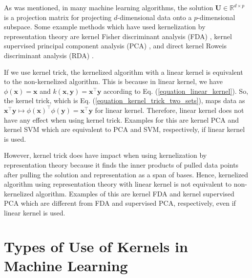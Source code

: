 \documentclass[lang=cn,10pt]{gorgeousnbook}
\numberwithin{equation}{section}%
\numberwithin{figure}{section}%
\begin{document}
As was mentioned, in many machine learning algorithms, the solution $\boldsymbol{U} \in \mathbb{R}^{d \times p}$ is a projection matrix for projecting $d$-dimensional data onto a $p$-dimensional subspace. Some example methods which have used kernelization by representation theory are kernel Fisher discriminant analysis (FDA) \cite{mika1999fisher,ghojogh2019fisher},
kernel supervised principal component analysis (PCA) \cite{barshan2011supervised,ghojogh2019unsupervised}, and direct kernel Roweis discriminant analysis (RDA) \cite{ghojogh2020generalized}. 

\begin{remark}\label{remark_linear_kernel_equivalent_to_non_kernelized}
If we use kernel trick, the kernelized algorithm with a linear kernel is equivalent to the non-kernelized algorithm. This is because in linear kernel, we have $\phi(\boldsymbol{x}) = \boldsymbol{x}$ and $k(\boldsymbol{x}, \boldsymbol{y}) = \boldsymbol{x}^\top \boldsymbol{y}$ according to Eq. (\ref{equation_linear_kernel}). So, the kernel trick, which is Eq. (\ref{equation_kernel_trick_two_sets}), maps data as $\boldsymbol{x}^\top \boldsymbol{y} \mapsto \phi(\boldsymbol{x})^\top \phi(\boldsymbol{y}) = \boldsymbol{x}^\top \boldsymbol{y}$ for linear kernel. Therefore, linear kernel does not have any effect when using kernel trick. Examples for this are kernel PCA \cite{scholkopf1997kernel,scholkopf1998nonlinear,ghojogh2019unsupervised} and kernel SVM \cite{boser1992training,vapnik1995nature} which are equivalent to PCA and SVM, respectively, if linear kernel is used. 

However, kernel trick does have impact when using kernelization by representation theory because it finds the inner products of pulled data points after pulling the solution and representation as a span of bases. Hence, kernelized algorithm using representation theory with linear kernel is not equivalent to non-kernelized algorithm. Examples of this are kernel FDA \cite{mika1999fisher,ghojogh2019fisher} and kernel supervised PCA \cite{barshan2011supervised,ghojogh2019unsupervised} which are different from FDA and supervised PCA, respectively, even if linear kernel is used. 
\end{remark}







\section{Types of Use of Kernels in Machine Learning}\label{section_kernel_in_machine_learning}
\end{document}
